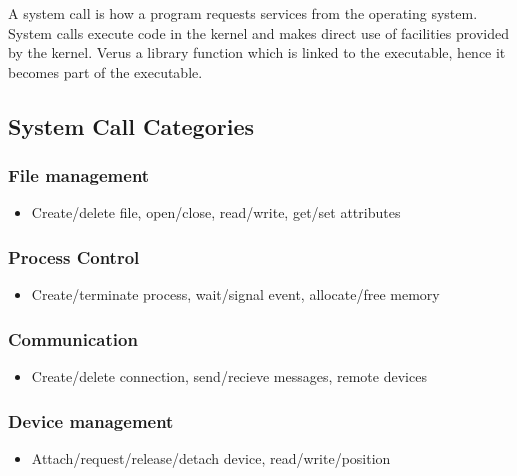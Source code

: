 \documentclass{report}
\begin{document}
    \pagebreak 
    \bigbreak \noindent 
    \begin{concept}
       A system call is how a program requests services from the operating system. System calls execute code in the kernel and makes direct use of facilities provided by the kernel. Verus a library function which is linked to the executable, hence it becomes part of the executable.
    \end{concept}
    \bigbreak \noindent 
    \subsection{System Call Categories}
    \bigbreak \noindent 
    \subsubsection{File management}
    \begin{itemize}
        \item Create/delete file, open/close, read/write, get/set attributes 
    \end{itemize}
    \bigbreak \noindent 
    \subsubsection{Process Control}
    \begin{itemize}
        \item Create/terminate process, wait/signal event, allocate/free memory
    \end{itemize}
    \bigbreak \noindent 
    \subsubsection{Communication}
    \begin{itemize}
        \item Create/delete connection, send/recieve messages, remote devices
    \end{itemize}
    \bigbreak \noindent 
    \subsubsection{Device management}
    \begin{itemize}
        \item Attach/request/release/detach device, read/write/position
    \end{itemize}

    \bigbreak \noindent 
\end{document}
